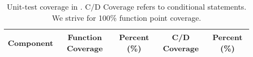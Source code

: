 

\begin{table}
  \caption{
    Unit-test coverage in \dracor.  C/D Coverage refers to conditional
    statements.  We strive for 100\% function point coverage.  
  }
  \label{tab:coverage}
  \begin{center}
    \begin{tabular}{lcrcr}\hline\hline
      \multicolumn{1}{c}{Component} &
      \multicolumn{1}{c}{Function Coverage} &
      \multicolumn{1}{c}{Percent (\%)} &
      \multicolumn{1}{c}{C/D Coverage} &
      \multicolumn{1}{c}{Percent (\%)} \\\hline


\end{tabular}
\end{center}
\end{table}
